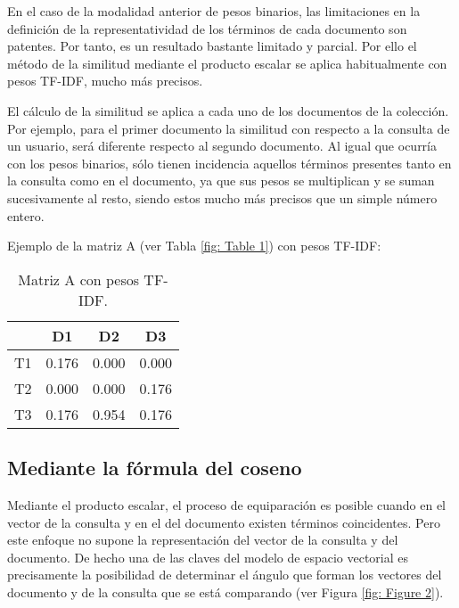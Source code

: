 \documentclass[titlepage]{article}
\begin{document}
	En el caso de la modalidad anterior de pesos binarios, las limitaciones en la definición de la representatividad de los términos de cada documento son patentes. Por tanto, es un resultado bastante limitado y parcial. Por ello el método de la similitud mediante el producto escalar se aplica habitualmente con pesos TF-IDF, mucho más precisos.
	
	El cálculo de la similitud se aplica a cada uno de los documentos de la colección. Por ejemplo, para el primer documento la similitud con respecto a la consulta de un usuario, será diferente respecto al segundo documento. Al igual que ocurría con los pesos binarios, sólo tienen incidencia aquellos términos presentes tanto en la consulta como en el documento, ya que sus pesos se multiplican y se suman sucesivamente al resto, siendo estos mucho más precisos que un simple número entero.
	
	\newpage
	Ejemplo de la matriz A (ver Tabla \ref{fig: Table 1}) con pesos TF-IDF:
	
	\begin{table}[h]
		\begin{center}
			\begin{tabular}{ |c|c|c|c| }
				\hline 
				& D1 & D2 & D3 \\
				\hline
				T1 & 0.176 & 0.000 & 0.000 \\ 
				\hline
				T2 & 0.000 & 0.000	& 0.176 \\ 
				\hline
				T3 & 0.176 & 0.954 & 0.176 \\
				\hline
			\end{tabular}
			\caption{Matriz A con pesos TF-IDF.}
			\label{fig: Table 3}
		\end{center}
	\end{table}
	
	\subsection{Mediante la fórmula del coseno}
	
	Mediante el producto escalar, el proceso de equiparación es posible cuando en el vector de la consulta y en el del documento existen términos coincidentes. Pero este enfoque no supone la representación del vector de la consulta y del documento. De hecho una de las claves del modelo de espacio vectorial es precisamente la posibilidad de determinar el ángulo que forman los vectores del documento y de la consulta que se está comparando (ver Figura \ref{fig: Figure 2}).
	
\end{document}
